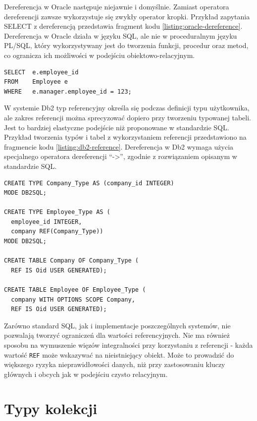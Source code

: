 \documentclass[a4paper,twoside,12pt]{book}
\begin{document}
Dereferencja w Oracle następuje niejawnie i domyślnie. Zamiast operatora dereferencji zawsze wykorzystuje się zwykły operator kropki. Przykład zapytania SELECT z dereferencją przedstawia fragment kodu \ref{listing:oracle-dereference}. Dereferencja w Oracle działa w języku SQL, ale nie w proceduralnym języku PL/SQL, który wykorzystywany jest do tworzenia funkcji, procedur oraz metod, co ogranicza ich możliwości w podejściu obiektowo-relacyjnym.

\begin{lstlisting}[style=SQL, caption={Zapytanie z dereferencją w Oracle Database.}, label={listing:oracle-dereference}, captionpos=b]
SELECT  e.employee_id
FROM    Employee e
WHERE   e.manager.employee_id = 123;
\end{lstlisting}

W systemie Db2 typ referencyjny określa się podczas definicji typu użytkownika, ale zakres referencji można sprecyzować dopiero przy tworzeniu typowanej tabeli. Jest to bardziej elastyczne podejście niż proponowane w standardzie SQL. Przykład tworzenia typów i tabel z wykorzystaniem referencji przedstawiono na fragmencie kodu \ref{listing:db2-reference}. Dereferencja w Db2 wymaga użycia specjalnego operatora dereferencji ``->'', zgodnie z rozwiązaniem opisanym w standardzie SQL.

\begin{lstlisting}[style=SQL, caption={Korzystanie z referencji w IBM Db2.}, label={listing:db2-reference}, captionpos=b]
CREATE TYPE Company_Type AS (company_id INTEGER) 
MODE DB2SQL;

CREATE TYPE Employee_Type AS (
  employee_id INTEGER, 
  company REF(Company_Type))
MODE DB2SQL;

CREATE TABLE Company OF Company_Type (
  REF IS Oid USER GENERATED);

CREATE TABLE Employee OF Employee_Type (
  company WITH OPTIONS SCOPE Company,
  REF IS Oid USER GENERATED);
\end{lstlisting}

Zarówno standard SQL, jak i implementacje poszczególnych systemów, nie pozwalają tworzyć ograniczeń dla wartości referencyjnych. Nie ma również sposobu na wymuszenie więzów integralności przy korzystaniu z referencji - każda wartość \lstinline{REF} może wskazywać na nieistniejący obiekt. Może to prowadzić do większego ryzyka nieprawidłowości danych, niż przy zastosowaniu kluczy głównych i obcych jak w podejściu czysto relacyjnym.

\section{Typy kolekcji}
\label{section:collection-types}
\end{document}
